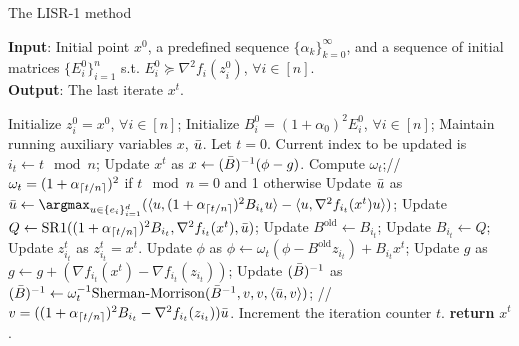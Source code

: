 \documentclass[letterpaper]{article} %
\theoremstyle{plain}
\theoremstyle{definition}
\theoremstyle{remark}
\DeclarePairedDelimiter\ceil{\lceil}{\rceil}
\begin{document}
\begin{algorithm}[tb]
\caption{The LISR-1 method}
\label{alg:iqn_algos_efficient}
\textbf{Input}: Initial point $x^0$, a predefined sequence $\{\alpha_k\}_{k=0}^{\infty}$, and a sequence of initial matrices $\{E_i^0\}_{i=1}^n$ s.t. $E_i^0 \succeq \nabla^2 f_i(z_i^0)$, $\forall i \in [n]$.\\
\textbf{Output}: The last iterate $x^t$.
\begin{algorithmic}[1] %
\STATE Initialize $z_i^0 = x^0$, $\forall i \in [n]$; Initialize $B_i^0 = (1 + \alpha_0)^2 E_i^0$, $\forall i \in [n]$;
\STATE Maintain running auxiliary variables $x$, $\Bar{u}$.
\STATE Let $t=0$.
\STATE Current index to be updated is $i_t \gets t \mod n$;
\STATE Update $x^t$ as $x \gets (\Bar{B})^{-1} (\phi - g)$.
\STATE Compute $\omega_t$;// $\omega_t = (1 + \alpha_{\ceil{t/n}})^2$ if $t \mod n = 0$ and 1 otherwise
\STATE Update $\Bar{u}$ as $\Bar{u} \gets \argmax_{u \in \{ e_i\}_{i=1}^d} (\langle u, (1 + \alpha_{\ceil{t/n}})^2 B_{i_t} u \rangle - \langle u, \nabla^2 f_{i_t}(x^t) u\rangle)$;
\STATE Update $Q \gets  \mathrm{SR}1 ((1 + \alpha_{\ceil{t/n}})^2 B_{i_t}, \nabla^2 f_{i_t}(x^t), \Bar{u})$;
\STATE Update $B^{\textrm{old}} \gets B_{i_t}$;
\STATE Update $B_{i_t} \gets Q$;
\STATE Update $z_{i_t}^t$ as $z_{i_t}^t = x^t$.
\STATE Update $\phi$ as $\phi \gets \omega_t (\phi - B^{\textrm{old}} z_{i_t}) + B_{i_t} x^t$;
\STATE Update $g$ as $g \gets g + (\nabla f_{i_t} (x^t) - \nabla f_{i_t} (z_{i_t}))$;
\STATE Update $(\Bar{B})^{-1}$ as $(\Bar{B})^{-1} \gets \omega_t^{-1} \mathrm{Sherman}\textrm{-} \mathrm{Morrison}(\Bar{B}^{-1}, v, v, \langle \Bar{u}, v \rangle)$; // $v = ((1 + \alpha_{\ceil{t/n}})^2 B_{i_t} - \nabla^2 f_{i_t}(z_{i_t})) \Bar{u}$.
\STATE Increment the iteration counter $t$.
\ENDWHILE
\STATE \textbf{return} $x^t$.
\end{algorithmic}
\end{algorithm}
\end{document}

